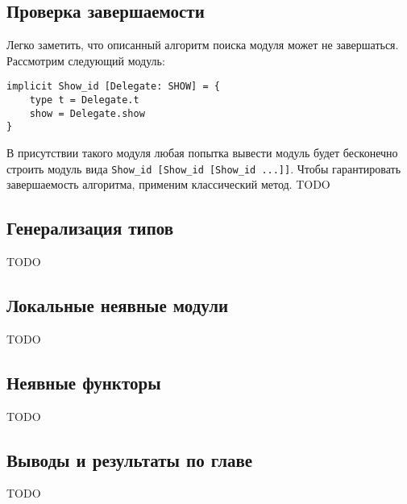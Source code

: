 \documentclass[../diploma.tex]{subfiles}
\begin{document}
\label{sec:2}

\subsection{Проверка завершаемости}

Легко заметить, что описанный алгоритм поиска модуля может не завершаться. Рассмотрим следующий модуль:

\begin{verbatim}
implicit Show_id [Delegate: SHOW] = {
    type t = Delegate.t
    show = Delegate.show
}
\end{verbatim}

В присутствии такого модуля любая попытка вывести модуль будет бесконечно строить модуль вида \texttt{Show\_id [Show\_id [Show\_id ...]]}. Чтобы гарантировать завершаемость алгоритма, применим классический метод. TODO

\subsection{Генерализация типов}

TODO

\subsection{Локальные неявные модули}

TODO

\subsection{Неявные функторы}

TODO

\subsection{Выводы и результаты по главе}

TODO
\end{document}

